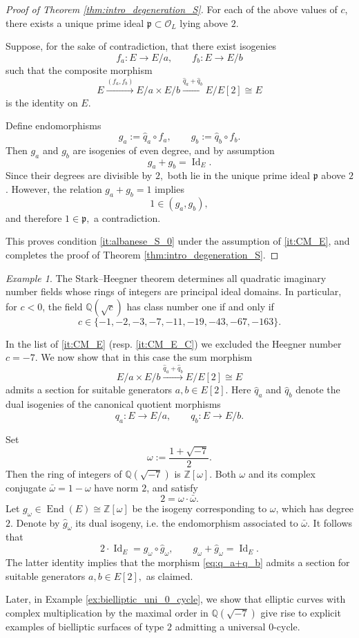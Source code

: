 \documentclass[11pt,letterpaper]{amsart}
\numberwithin{equation}{section}
\theoremstyle{definition}
\theoremstyle{remark}
\newtheorem{example}[theorem]{Example}
\newcommand{\Q}{\mathbb{Q}}
\newcommand{\Z}{\mathbb{Z}}
\DeclareMathOperator{\End}{End}
\DeclareMathOperator{\Id}{Id}
\begin{document}
\begin{proof}[Proof of Theorem \ref{thm:intro_degeneration_S}]
For each of the above values of $c$, there exists a unique prime ideal $\mathfrak{p}\subset\mathcal{O}_{L}$ lying above $2$.\par Suppose, for the sake of contradiction, that there exist isogenies $$f_{a}\colon E\longrightarrow E/a,\qquad f_{b}\colon E\longrightarrow E/b$$
such that the composite morphism $$E\overset{(f_a,f_b)}{\longrightarrow}E/a\times E/b\overset{\hat{q}_a+\hat{q}_{b}}{\longrightarrow} E/E[2]\cong E$$
is the identity on $E$.\par
Define endomorphisms $$g_{a}:=\hat{q}_a\circ f_{a},\qquad  g_{b}:=\hat{q}_b\circ f_{b}.$$
Then $g_a$ and $g_b$ are isogenies of even degree, and by assumption $$g_a+g_b=\Id_E.$$ Since their degrees are divisible by $2,$ both lie in the unique prime ideal $\mathfrak{p}$ above $2$. However, the relation $g_a+g_b=1$ implies $$1\in(g_{a},g_{b}),$$ and therefore $1\in\mathfrak{p},$ a contradiction.\par
This proves condition \eqref{it:albanese_S_0} under the assumption of \ref{it:CM_E}, and completes the proof of Theorem \ref{thm:intro_degeneration_S}.
\end{proof}
\begin{example}\label{ex:example_with_section}
The Stark--Heegner theorem determines all quadratic imaginary number fields whose rings of integers are principal ideal domains. In particular, for $c<0$, the field $\Q(\sqrt{c})$ has class number one if and only if
$$
c\in\{-1,-2,-3,-7,-11,-19,-43,-67,-163\}.
$$

In the list of \ref{it:CM_E} (resp. \ref{it:CM_E_C}) we excluded the Heegner number $c=-7$. We now show that in this case the sum morphism
\begin{equation}\label{eq:q_a+q_b}
E/a \times E/b \overset{\hat{q}_a+\hat{q}_b}{\longrightarrow} E/E[2]\cong E
\end{equation}
admits a section for suitable generators $a,b\in E[2]$. Here $\hat{q}_a$ and $\hat{q}_b$ denote the dual isogenies of the canonical quotient morphisms
$$
q_a\colon E\longrightarrow E/a,
\qquad
q_b\colon E\longrightarrow E/b.
$$

Set
$$
\omega:=\frac{1+\sqrt{-7}}{2}.
$$
Then the ring of integers of $\Q(\sqrt{-7})$ is $\Z[\omega]$. Both $\omega$ and its complex conjugate $\bar{\omega}=1-\omega$ have norm $2$, and satisfy
$$
2=\omega\cdot\bar{\omega}.
$$
Let $g_\omega\in\End(E)\cong\Z[\omega]$ be the isogeny corresponding to $\omega$, which has degree $2$. Denote by $\hat{g}_\omega$ its dual isogeny, i.e. the endomorphism associated to $\bar{\omega}$. It follows that
$$
2\cdot\Id_E = g_\omega\circ\hat{g}_\omega,
\qquad
g_\omega+\hat{g}_\omega=\Id_E.
$$
The latter identity implies that the morphism \eqref{eq:q_a+q_b} admits a section for suitable generators $a,b\in E[2],$ as claimed.\par
Later, in Example \ref{ex:bielliptic_uni_0_cycle}, we show that elliptic curves with complex multiplication by the maximal order in $\Q(\sqrt{-7})$ give rise to explicit examples of bielliptic surfaces of type $2$ admitting a universal $0$-cycle. 
\end{example}
\end{document}
